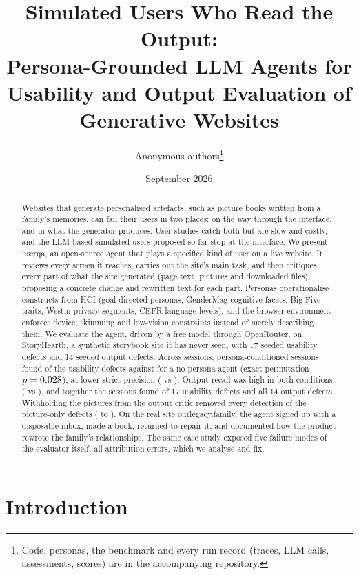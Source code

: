 \documentclass[10pt,twocolumn]{article}
\title{Simulated Users Who Read the Output:\\Persona-Grounded LLM Agents for Usability and Output Evaluation of Generative Websites}
\author{Anonymous authors\thanks{Code, personas, the \site{} benchmark and every run record (traces, LLM calls, assessments, scores) are in the accompanying repository.}}
\date{September 2026}
\newcommand{\sys}{\textsf{userqa}}
\newcommand{\site}{StoryHearth}
\newcommand{\ol}{\textsf{ourlegacy.family}}
\begin{document}
\maketitle

\begin{abstract}
Websites that generate personalised artefacts, such as picture books written from a family's memories, can fail their users in two places: on the way through the interface, and in what the generator produces. User studies catch both but are slow and costly, and the LLM-based simulated users proposed so far stop at the interface. We present \sys{}, an open-source agent that plays a specified kind of user on a live website. It reviews every screen it reaches, carries out the site's main task, and then critiques every part of what the site generated (page text, pictures and downloaded files), proposing a concrete change and rewritten text for each part. Personas operationalise constructs from HCI (goal-directed personas, GenderMag cognitive facets, Big Five traits, Westin privacy segments, CEFR language levels), and the browser environment enforces device, skimming and low-vision constraints instead of merely describing them. We evaluate the agent, driven by a free model through OpenRouter, on \site{}, a synthetic storybook site it has never seen, with 17 seeded usability defects and 14 seeded output defects. Across \NRuns{} sessions, persona-conditioned sessions found \UXRecallMean{} of the usability defects against \UXRecallGenericMean{} for a no-persona agent (exact permutation $p = 0.028$), at lower strict precision (\PStrictMean{} vs \PStrictGenericMean{}). Output recall was high in both conditions (\OutRecallMean{} vs \OutRecallGenericMean{}), and together the sessions found \UnionUX{} of 17 usability defects and all 14 output defects. Withholding the pictures from the output critic removed every detection of the picture-only defects (\VisVisualMean{} to \NoVisVisualMean{}). On the real site \ol{}, the agent signed up with a disposable inbox, made a book, returned to repair it, and documented how the product rewrote the family's relationships. The same case study exposed five failure modes of the evaluator itself, all attribution errors, which we analyse and fix.
\end{abstract}

\section{Introduction}
\label{sec:intro}
\end{document}
